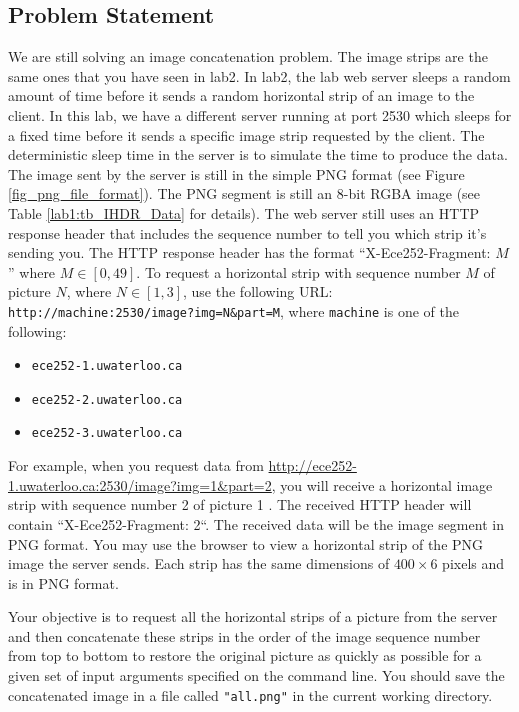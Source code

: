 \subsection{Problem Statement}
We are still solving an image concatenation problem. The image strips are the same ones that you have seen in lab2. In lab2, the lab web server sleeps a random amount of time before it sends a random horizontal strip of an image to the client. In this lab, we have a different server running at port 2530 which sleeps for a fixed time before it sends a specific image strip requested by the client. The deterministic sleep time in the server is to simulate the time to produce the data. The image sent by the server is still in the simple PNG format (see Figure \ref{fig_png_file_format}). The PNG segment is still an 8-bit RGBA image (see Table \ref{lab1:tb_IHDR_Data} for details). The web server still uses an HTTP response header that includes the sequence number to tell you which strip it's sending you. The HTTP response header has the format ``X-Ece252-Fragment: $M$'' where $M \in [0, 49]$. To request a  horizontal strip with sequence number $M$ of picture $N$, where $N\in[1, 3]$, use the following URL:
\verb+http://machine:2530/image?img=N&part=M+, where \texttt{machine} is one of the following:
\begin{itemize}
\item \texttt{ece252-1.uwaterloo.ca}
\item \texttt{ece252-2.uwaterloo.ca}
\item \texttt{ece252-3.uwaterloo.ca}
\end{itemize}

For example, when you request data from
\url{http://ece252-1.uwaterloo.ca:2530/image?img=1\&part=2}, 
you will receive a horizontal image strip with sequence number 2 of picture 1 . The received HTTP header will contain ``X-Ece252-Fragment: 2``. The received data will be the image segment in PNG format.
You may use the browser to view a horizontal strip of the PNG image the server sends. Each strip has the same dimensions of $400 \times 6$ pixels and is in PNG format. 

Your objective is to request all the horizontal strips of a picture from the server and then concatenate these strips in the order of the image sequence number from top to bottom to restore the original picture as quickly as possible for a given set of input arguments specified on the command line. You should save the concatenated image in a file called \verb+"all.png"+ in the current working directory.

